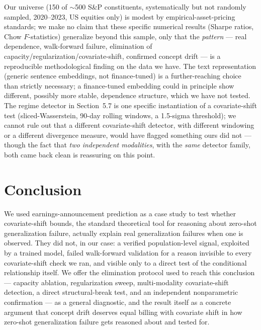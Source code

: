 \documentclass[11pt]{article}
\begin{document}
Our universe (150 of $\sim$500 S\&P constituents, systematically but not randomly sampled, 2020--2023, US equities only) is modest by empirical-asset-pricing standards; we make no claim that these specific numerical results (Sharpe ratios, Chow $F$-statistics) generalize beyond this sample, only that the \emph{pattern} --- real dependence, walk-forward failure, elimination of capacity/regularization/covariate-shift, confirmed concept drift --- is a reproducible methodological finding on the data we have. The text representation (generic sentence embeddings, not finance-tuned) is a further-reaching choice than strictly necessary; a finance-tuned embedding could in principle show different, possibly more stable, dependence structure, which we have not tested. The regime detector in Section~5.7 is one specific instantiation of a covariate-shift test (sliced-Wasserstein, 90-day rolling windows, a 1.5-sigma threshold); we cannot rule out that a different covariate-shift detector, with different windowing or a different divergence measure, would have flagged something ours did not --- though the fact that \emph{two independent modalities}, with the \emph{same} detector family, both came back clean is reassuring on this point.

\section{Conclusion}

We used earnings-announcement prediction as a case study to test whether covariate-shift bounds, the standard theoretical tool for reasoning about zero-shot generalization failure, actually explain real generalization failures when one is observed. They did not, in our case: a verified population-level signal, exploited by a trained model, failed walk-forward validation for a reason invisible to every covariate-shift check we ran, and visible only to a direct test of the conditional relationship itself. We offer the elimination protocol used to reach this conclusion --- capacity ablation, regularization sweep, multi-modality covariate-shift detection, a direct structural-break test, and an independent nonparametric confirmation --- as a general diagnostic, and the result itself as a concrete argument that concept drift deserves equal billing with covariate shift in how zero-shot generalization failure gets reasoned about and tested for.




\appendix
\end{document}
